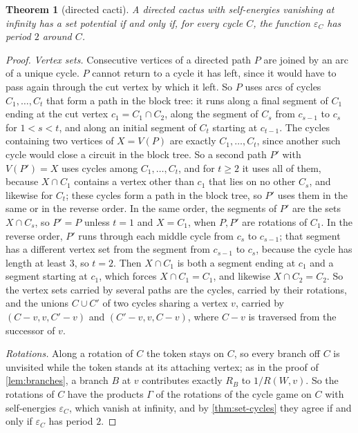 \documentclass[11pt]{amsart}
\theoremstyle{plain}
\newtheorem{theorem}{Theorem}[section]
\theoremstyle{definition}
\theoremstyle{remark}
\numberwithin{equation}{section}
\begin{document}
\begin{theorem}[directed cacti]\label{thm:cacti}
A directed cactus with self-energies vanishing at infinity has a set potential if and only if, for every cycle $C$, the function $\varepsilon_C$ has period $2$ around $C$.
\end{theorem}
\begin{proof}
\emph{Vertex sets.} Consecutive vertices of a directed path $P$ are joined by an arc of a unique cycle. $P$ cannot return to a cycle it has left, since it would have to pass again through the cut vertex by which it left. So $P$ uses arcs of cycles $C_1,\dots,C_t$ that form a path in the block tree: it runs along a final segment of $C_1$ ending at the cut vertex $c_1=C_1\cap C_2$, along the segment of $C_s$ from $c_{s-1}$ to $c_s$ for $1<s<t$, and along an initial segment of $C_t$ starting at $c_{t-1}$. The cycles containing two vertices of $X=V(P)$ are exactly $C_1,\dots,C_t$, since another such cycle would close a circuit in the block tree. So a second path $P'$ with $V(P')=X$ uses cycles among $C_1,\dots,C_t$, and for $t\ge2$ it uses all of them, because $X\cap C_1$ contains a vertex other than $c_1$ that lies on no other $C_s$, and likewise for $C_t$; these cycles form a path in the block tree, so $P'$ uses them in the same or in the reverse order. In the same order, the segments of $P'$ are the sets $X\cap C_s$, so $P'=P$ unless $t=1$ and $X=C_1$, when $P,P'$ are rotations of $C_1$. In the reverse order, $P'$ runs through each middle cycle from $c_s$ to $c_{s-1}$; that segment has a different vertex set from the segment from $c_{s-1}$ to $c_s$, because the cycle has length at least $3$, so $t=2$. Then $X\cap C_1$ is both a segment ending at $c_1$ and a segment starting at $c_1$, which forces $X\cap C_1=C_1$, and likewise $X\cap C_2=C_2$. So the vertex sets carried by several paths are the cycles, carried by their rotations, and the unions $C\cup C'$ of two cycles sharing a vertex $v$, carried by $(C-v,v,C'-v)$ and $(C'-v,v,C-v)$, where $C-v$ is traversed from the successor of $v$.

\emph{Rotations.} Along a rotation of $C$ the token stays on $C$, so every branch off $C$ is unvisited while the token stands at its attaching vertex; as in the proof of \cref{lem:branches}, a branch $B$ at $v$ contributes exactly $R_B$ to $1/R(W,v)$. So the rotations of $C$ have the products $\Gamma$ of the rotations of the cycle game on $C$ with self-energies $\varepsilon_C$, which vanish at infinity, and by \cref{thm:set-cycles} they agree if and only if $\varepsilon_C$ has period $2$.


\end{proof}
\end{document}
